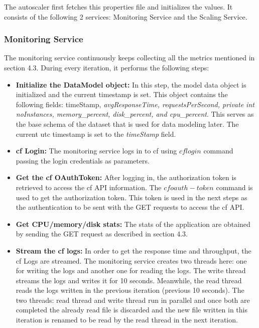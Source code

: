 \documentclass[article,type=msc,colorback,12pt,accentcolor=tud8b,table]{tudthesis}
\begin{document}
	The autoscaler first fetches this properties file and initializes the values. It consists of the following 2 services: Monitoring Service and the Scaling Service. 
	
\subsubsection{Monitoring Service}
	
	The monitoring service continuously keeps collecting all the metrics mentioned in section 4.3. During every iteration, it performs the following steps:
	\begin{itemize}
		\item{\textbf{Initialize the DataModel object:}} In this step, the model data object is initialized and the current timestamp is set. This object contains the following fields: timeStamp, \textit{avgResponseTime, requestsPerSecond, private int noInstances, memory\_percent, disk\_percent, and cpu\_percent}. This serves as the base schema of the dataset that is used for data modeling later. The current \gls{utc} timestamp is set to the \textit{timeStamp} field.

\item{\textbf{\gls{cf} Login:}} The monitoring service logs in to \gls{cf} using $cf login$ command passing the login credentials as parameters.

\item{\textbf{Get the \gls{cf} OAuthToken:}} After logging in, the authorization token is retrieved to access the \gls{cf} API information. The $cf oauth-token$ command is used to get the authorization token. This token is used in the next steps as the authentication to be sent with the GET requests to access the \gls{cf} API.
		
\item{\textbf{Get CPU/memory/disk stats:}} 
The stats of the application are obtained by sending the GET request as described in section 4.3.
		
\item{\textbf{Stream the \gls{cf} logs:}} In order to get the response time and throughput, the \gls{cf} Logs are streamed. The monitoring service creates two threads here: one for writing the logs and another one for reading the logs. The write thread streams the logs and writes it for 10 seconds. Meanwhile, the read thread reads the logs written in the previous iteration (previous 10 seconds). The two threads: read thread and write thread run in parallel and once both are completed the already read file is discarded and the new file written in this iteration is renamed to be read by the read thread in the next iteration.


\end{itemize}
\end{document}
